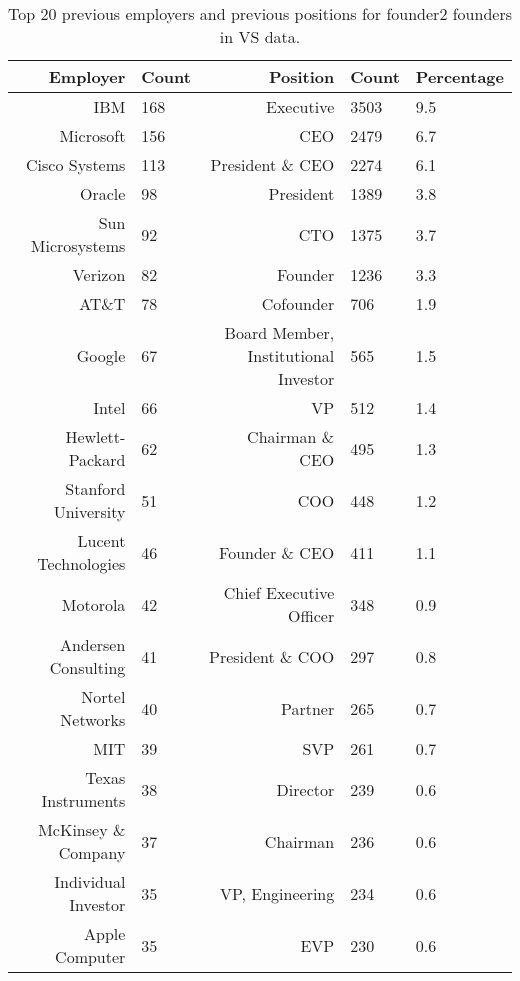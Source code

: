 \begin{table}[]
\centering
\begingroup\normalsize
\begin{tabular}{rlrll}
  \toprule
Employer & Count & Position & Count & Percentage \\ 
  \midrule
IBM & 168 & Executive & 3503 & 9.5 \\ 
  Microsoft & 156 & CEO & 2479 & 6.7 \\ 
  Cisco Systems & 113 & President \& CEO & 2274 & 6.1 \\ 
  Oracle & 98 & President & 1389 & 3.8 \\ 
  Sun Microsystems & 92 & CTO & 1375 & 3.7 \\ 
  Verizon & 82 & Founder & 1236 & 3.3 \\ 
  AT\&T & 78 & Cofounder & 706 & 1.9 \\ 
  Google & 67 & Board Member, Institutional Investor & 565 & 1.5 \\ 
  Intel & 66 & VP & 512 & 1.4 \\ 
  Hewlett-Packard & 62 & Chairman \& CEO & 495 & 1.3 \\ 
  Stanford University & 51 & COO & 448 & 1.2 \\ 
  Lucent Technologies & 46 & Founder \& CEO & 411 & 1.1 \\ 
  Motorola & 42 & Chief Executive Officer & 348 & 0.9 \\ 
  Andersen Consulting & 41 & President \& COO & 297 & 0.8 \\ 
  Nortel Networks & 40 & Partner & 265 & 0.7 \\ 
  MIT & 39 & SVP & 261 & 0.7 \\ 
  Texas Instruments & 38 & Director & 239 & 0.6 \\ 
  McKinsey \& Company & 37 & Chairman & 236 & 0.6 \\ 
  Individual Investor & 35 & VP, Engineering & 234 & 0.6 \\ 
  Apple Computer & 35 & EVP & 230 & 0.6 \\ 
   \bottomrule
\end{tabular}
\endgroup
\caption{Top 20 previous employers and previous positions for founder2 founders in VS data.} 
\label{table:VS_previousEmployersSummaryTable}
\end{table}

